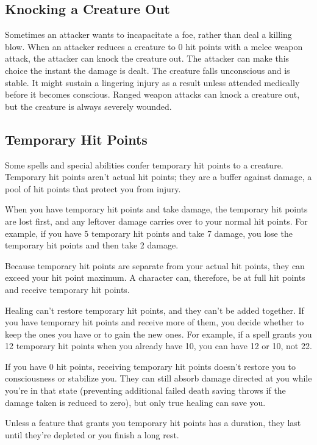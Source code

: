 \subsection{Knocking a Creature Out}

Sometimes an attacker wants to incapacitate a foe, rather than deal a killing blow. When an attacker reduces a creature to 0 hit points with a melee weapon attack, the attacker can knock the creature out. The attacker can make this choice the instant the damage is dealt. The creature falls unconscious and is stable. It might sustain a lingering injury as a result unless attended medically before it becomes conscious. Ranged weapon attacks can knock a creature out, but the creature is always severely wounded.

\subsection{Temporary Hit Points}

Some spells and special abilities confer temporary hit points to a creature. Temporary hit points aren't actual hit points; they are a buffer against damage, a pool of hit points that protect you from injury.

When you have temporary hit points and take damage, the temporary hit points are lost first, and any leftover damage carries over to your normal hit points. For example, if you have 5 temporary hit points and take 7 damage, you lose the temporary hit points and then take 2 damage.

Because temporary hit points are separate from your actual hit points, they can exceed your hit point maximum. A character can, therefore, be at full hit points and receive temporary hit points.

Healing can't restore temporary hit points, and they can't be added together. If you have temporary hit points and receive more of them, you decide whether to keep the ones you have or to gain the new ones. For example, if a spell grants you 12 temporary hit points when you already have 10, you can have 12 or 10, not 22.

If you have 0 hit points, receiving temporary hit points doesn't restore you to consciousness or stabilize you. They can still absorb damage directed at you while you're in that state (preventing additional failed death saving throws if the damage taken is reduced to zero), but only true healing can save you.

Unless a feature that grants you temporary hit points has a duration, they last until they're depleted or you finish a long rest.

